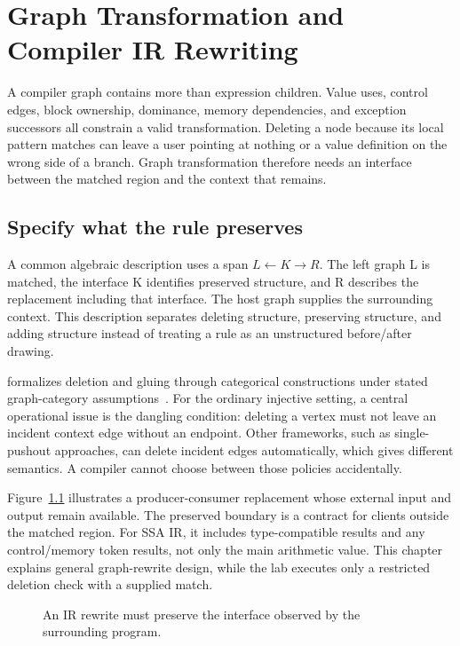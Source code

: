 \chapter{Graph Transformation and Compiler IR Rewriting}
\label{ch:compiler-graph-transformation}

A compiler graph contains more than expression children.
Value uses, control edges, block ownership, dominance, memory dependencies, and exception successors all constrain a valid transformation.
Deleting a node because its local pattern matches can leave a user pointing at nothing or a value definition on the wrong side of a branch.
Graph transformation therefore needs an interface between the matched region and the context that remains.

\section{Specify what the rule preserves}
\label{sec:ch87-interface}
A common algebraic description uses a span $L\leftarrow K\to R$.
The left graph L is matched, the interface K identifies preserved structure, and R describes the replacement including that interface.
The host graph supplies the surrounding context.
This description separates deleting structure, preserving structure, and adding structure instead of treating a rule as an unstructured before/after drawing.

 formalizes deletion and gluing through categorical constructions under stated graph-category assumptions~\cite{graphtransformation-2006-fundamentals}.
For the ordinary injective setting, a central operational issue is the dangling condition: deleting a vertex must not leave an incident context edge without an endpoint.
Other frameworks, such as single-pushout approaches, can delete incident edges automatically, which gives different semantics.
A compiler cannot choose between those policies accidentally.

Figure~\ref{fig:ch87-interface} illustrates a producer-consumer replacement whose external input and output remain available.
The preserved boundary is a contract for clients outside the matched region.
For SSA IR, it includes type-compatible results and any control/memory token results, not only the main arithmetic value.
This chapter explains general graph-rewrite design, while the lab executes only a restricted deletion check with a supplied match.

\begin{figure}[htbp]
\centering
{}
\caption{An IR rewrite must preserve the interface observed by the surrounding program.}
\label{fig:ch87-interface}
\end{figure}

